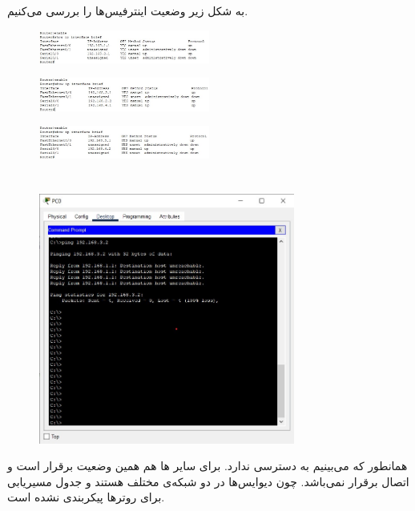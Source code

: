 \documentclass{article}
\begin{document}
\section{}%
به شکل زیر وضعیت اینترفیس‌ها را بررسی می‌کنیم.
\begin{figure}[H]
    \centering
    \includegraphics[width=0.5\textwidth]{figures/r2.jpg}
    \caption{}
    \label{fig:fig1}
\end{figure}
\begin{figure}[H]
    \centering
    \includegraphics[width=0.5\textwidth]{figures/r3.jpg}
    \caption{}
    \label{fig:fig1}
\end{figure}
\begin{figure}[H]
    \centering
    \includegraphics[width=0.5\textwidth]{figures/r4.jpg}
    \caption{}
    \label{fig:fig1}
\end{figure}

\section{}%
\begin{figure}[H]
    \centering
    \includegraphics[width=0.75\textwidth]{figures/13.jpg}
    \caption{}
    \label{fig:fig1}
\end{figure}
همانطور که می‌بینیم  به  دسترسی ندارد. برای سایر ها هم همین وضعیت برقرار است و اتصال برقرار نمی‌باشد. چون دیوایس‌ها در دو شبکه‌ی مختلف هستند و جدول مسیریابی برای روترها پیکربندی نشده است.
\end{document}
